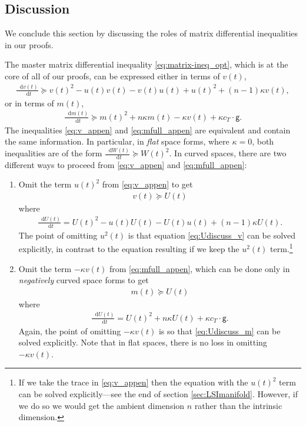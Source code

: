 \documentclass[a4paper,twoside,11pt,reqno]{amsart}
\newcommand*\diff{\mathop{}\!\mathrm{d}}
\newcommand{\GG}{\mathsf{g}}
\begin{document}
\subsection{Discussion}
\label{subsec:discussion}
We conclude this section by discussing the roles of matrix differential inequalities in our proofs. 
\newline

 The master matrix differential inequality \eqref{eq:matrix-ineq_opt}, which is at the core of all of our proofs, can be expressed either in terms of $v(t)$,
\begin{align}
\label{eq:v_appen}
\frac{\diff v(t)}{\diff t} \succeq v(t)^2- u(t)v(t)  - v(t) u(t) + u(t)^2 + (n-1)\kappa v(t),
\end{align}
or in terms of $m(t)$,
\begin{align}
\label{eq:mfull_appen}
\frac{\diff m(t)}{\diff t} \succeq  m(t)^2 + n\kappa m(t)-\kappa v(t)+\kappa c_T\cdot \GG. 
\end{align}
The inequalities \eqref{eq:v_appen} and \eqref{eq:mfull_appen} are equivalent and contain the same information. In particular, in  \emph{flat} space forms, where $\kappa=0$, both inequalities are of the form $\frac{\diff W(t)}{\diff t} \succeq  W(t)^2$. In curved spaces, there are two different ways to proceed from \eqref{eq:v_appen} and \eqref{eq:mfull_appen}:

\begin{enumerate}
\item Omit the term $u(t)^2$ from \eqref{eq:v_appen} to get
\begin{align}
v(t)\succeq U(t)
\end{align}
where 
\begin{align}
\label{eq:Udiscuss_v}
\frac{\diff U(t)}{\diff t} = U(t)^2- u(t)U(t)  - U(t) u(t) + (n-1)\kappa U(t).
\end{align}
The point of omitting $u^2(t)$ is that equation \eqref{eq:Udiscuss_v} can be solved explicitly, in contrast to the equation resulting if we keep the $u^2(t)$ term.\footnote{If we take the trace in \eqref{eq:v_appen} then the equation with the $u(t)^2$ term can be solved explicitly---see the end of section \ref{sec:LSImanifold}. However, if we do so we would get the ambient dimension $n$ rather than the intrinsic dimension.}
\item Omit the term  $-\kappa v(t)$ from  \eqref{eq:mfull_appen}, which can be done only in  \emph{negatively} curved space forms
to get 
\begin{align}
m(t)\succeq U(t)
\end{align}
where
\begin{align}
\label{eq:Udiscuss_m}
\frac{\diff U(t)}{\diff t} = U(t)^2+n\kappa U(t)+\kappa c_T\cdot \GG.
\end{align}
Again, the point of omitting $-\kappa v(t)$ is so that \eqref{eq:Udiscuss_m} can be solved explicitly. Note that in flat spaces, there is no loss in omitting $-\kappa v(t)$.
\end{enumerate}
\end{document}
